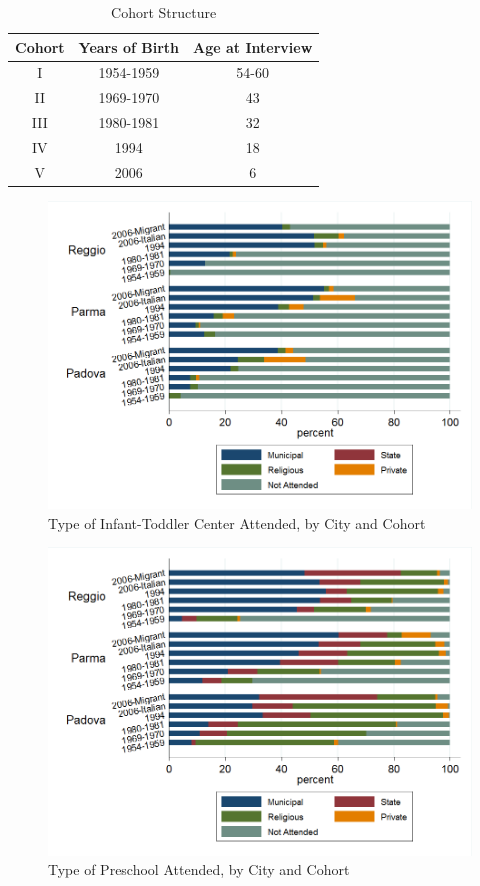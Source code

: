 \begin{table}[H] \caption{Cohort Structure} \label{tab:cohort-structure}
\begin{tabular}{ccc}
\toprule
Cohort & Years of Birth & Age at Interview \\ \midrule
I 	   & 1954-1959 		& 54-60 \\
II 	   & 1969-1970		& 43	\\
III    & 1980-1981		& 32    \\
IV 	   & 1994			& 18 	\\
V 	   & 2006			& 6 \\ 
\bottomrule 
\end{tabular}
\end{table}


\begin{figure}[H]
\caption{Type of Infant-Toddler Center Attended, by City and Cohort} \label{fig:attended-itc}
\includegraphics[scale=0.4]{../../../../output/image/asiloType-Attend.png} 
\end{figure}

\begin{figure}[H]
\caption{Type of Preschool Attended, by City and Cohort} \label{fig:attended-preschool}
\includegraphics[scale=0.4]{../../../../output/image/maternaType-Attend.png} 
\end{figure}


